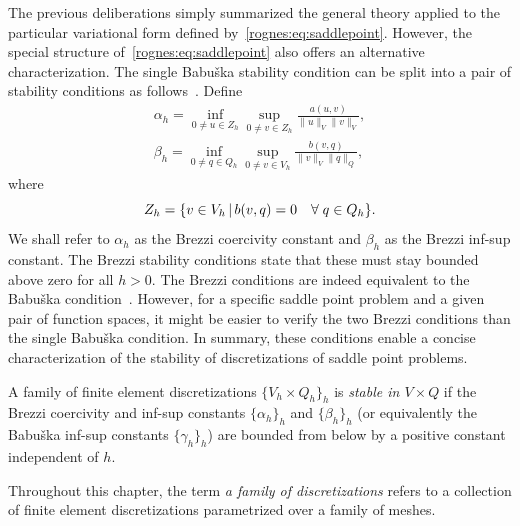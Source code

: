 The previous deliberations simply summarized the general theory
applied to the particular variational form defined
by~\eqref{rognes:eq:saddlepoint}. However, the special structure
of~\eqref{rognes:eq:saddlepoint} also offers an alternative
characterization. The single Babu\v ska stability condition can be split
into a pair of stability conditions as
follows~\cite{Brezzi1974}. Define
\begin{align}
  \label{rognes:eq:brezzi:coercivity}
  \alpha_h =
  \inf_{0 \not = u \in Z_h}
  \sup_{0 \not = v \in Z_h}
  \frac{a(u, v)}{\|u\|_{V} \|v\|_{V}} , \\
  \label{rognes:eq:brezzi:infsup}
  \beta_h =
  \inf_{0 \not = q \in Q_h}
  \sup_{0 \not = v \in V_h}
  \frac{b(v, q)}
       {\|v\|_{V} \|q\|_{Q}},
\end{align}
where
\begin{equation}
  Z_h = \{ v \in V_h \, | \, b(v, q) = 0 \quad \forall \; q \in Q_h\}.
\end{equation}
We shall refer to $\alpha_h$ as the Brezzi coercivity constant and
$\beta_h$ as the Brezzi inf-sup constant. The Brezzi stability
conditions state that these must stay bounded above zero for all $h >
0$. The Brezzi conditions are indeed equivalent to the Babu\v ska
condition~\cite{Brezzi1974}. However, for a specific saddle point
problem and a given pair of function spaces, it might be easier to
verify the two Brezzi conditions than the single Babu\v ska condition.
In summary, these conditions enable a concise characterization of the
stability of discretizations of saddle point problems.
\begin{definition}
  \label{rognes:def:stable}
  A family of finite element discretizations $\{V_h \times Q_h\}_h$ is
  \emph{stable in $V \times Q$} if the Brezzi coercivity and inf-sup
  constants $\{ \alpha_h \}_h $ and $\{ \beta_h \}_h$ (or equivalently
  the Babu\v{s}ka inf-sup constants $\{ \gamma_h \}_h$) are bounded
  from below by a positive constant independent of $h$.
\end{definition}
Throughout this chapter, the term \emph{a family of discretizations}
refers to a collection of finite element discretizations parametrized
over a family of meshes.

